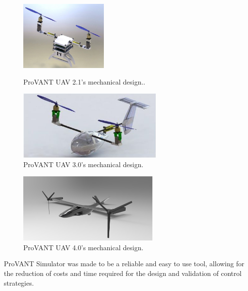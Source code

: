 \begin{figure} [H]
	\centering
	\begin{minipage}{.5\textwidth}
		\centering
		\includegraphics[height=3.5cm]{figuras/VANT21}
		\caption{ProVANT UAV 2.1's mechanical design..}
		\label{vant21}
	\end{minipage}%
	\begin{minipage}{.5\textwidth}
		\centering
		\includegraphics[height=3.5cm]{figuras/VANT3}
		\caption{ProVANT UAV 3.0's mechanical design.}
		\label{vant3}
	\end{minipage}
\end{figure}
							
\begin{figure} [H]
	\centering
	\begin{minipage}{.5\textwidth}
		\centering
		\includegraphics[height=3.5cm]{figuras/VANT4}
		\caption{ProVANT UAV 4.0's mechanical design.}
		\label{vant4}
	\end{minipage}
\end{figure}

ProVANT Simulator was made to be a reliable and easy to use tool, allowing for the reduction of costs and time required for the design and validation of control strategies.